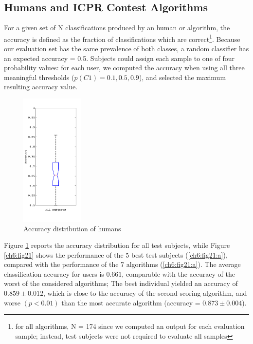 \vspace{0.5cm}

\subsection{Humans and ICPR Contest Algorithms}

For a given set of N classifications produced by an human or algorithm, the accuracy is defined as the fraction of classifications which are 
correct\footnote{for all algorithms, N = 174 since we computed an output for each evaluation sample;
instead, test subjects were not required to evaluate all samples}.
Because our evaluation set has the same prevalence of both classes, a random classifier has an expected accuracy = 0.5. Subjects could assign each sample to one of
four probability values: for each user, we computed the accuracy when using all three meaningful thresholds ($p(C1) = {0.1, 0.5, 0.9}$), and selected the maximum
resulting accuracy value.\\

\begin{figure}[!htb]
   \begin{center}
    \includegraphics[width=0.28\textwidth]{./images/human/p11.png}
    \caption{Accuracy distribution of humans}
    \label{ch6:fig20}
    \end{center}
\end{figure}


Figure \ref{ch6:fig20} reports the accuracy distribution for all test subjects, while Figure \ref{ch6:fig21} shows the
performance of the 5 best test subjects (\ref{ch6:fig21:a}), compared with the performance
of the 7 algorithms (\ref{ch6:fig21:a}). The average classification accuracy for users is 0.661,
comparable with the accuracy of the worst of the considered algorithms; The best
individual yielded an accuracy of $0.859 \pm 0.012$, which is close to the accuracy
of the second-scoring algorithm, and worse $(p < 0.01)$ than the most accurate
algorithm (accuracy = $0.873 \pm 0.004$).


